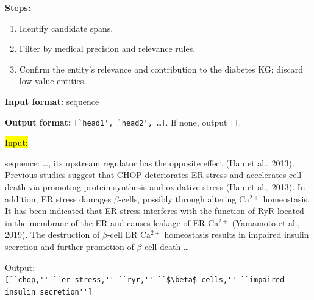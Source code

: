 \documentclass[10pt]{article}
\begin{document}
\begin{appendices}
\begin{tcolorbox}
\vspace{\baselineskip}

\textbf{Steps:}
\begin{enumerate}
  \item Identify candidate spans.
  \item Filter by medical precision and relevance rules.
  \item Confirm the entity's relevance and contribution to the diabetes KG; discard low-value entities.
\end{enumerate}

\vspace{\baselineskip}

\textbf{Input format:} sequence  

\textbf{Output format:} \verb|[`head1', `head2', …]|.  
If none, output \verb|[]|.

\end{tcolorbox}




\begin{tcolorbox}[
    title=Few-shot Example for Entity Discovery Prompt,
    halign title=center,
  colback=white,        %
  colframe=blue,       %
  boxrule=0.8pt,        %
  arc=4mm,              %
  left=4pt,             %
  right=4pt,            %
  top=4pt,              %
  bottom=4pt,            %
  fontupper=\small
]
\colorbox{Yellow}{Input:}\\

\begin{mdframed}[backgroundcolor=Yellow!20,skipabove=1em,skipbelow=1em,]
sequence: \dots, its upstream regulator has the opposite effect (Han et al., 2013). Previous studies suggest that CHOP deteriorates ER stress and accelerates cell death via promoting protein synthesis and oxidative stress (Han et al., 2013). In addition, ER stress damages $\beta$-cells, possibly through altering Ca$^{2+}$ homeostasis. It has been indicated that ER stress interferes with the function of RyR located in the membrane of the ER and causes leakage of ER Ca$^{2+}$ (Yamamoto et al., 2019). The destruction of $\beta$-cell ER Ca$^{2+}$ homeostasis results in impaired insulin secretion and further promotion of $\beta$-cell death \dots
\end{mdframed}

Output:\\
\verb|[``chop,'' ``er stress,'' ``ryr,'' ``$\beta$-cells,'' ``impaired insulin secretion'']|
\vspace{\baselineskip}


\end{tcolorbox}
\end{appendices}
\end{document}
